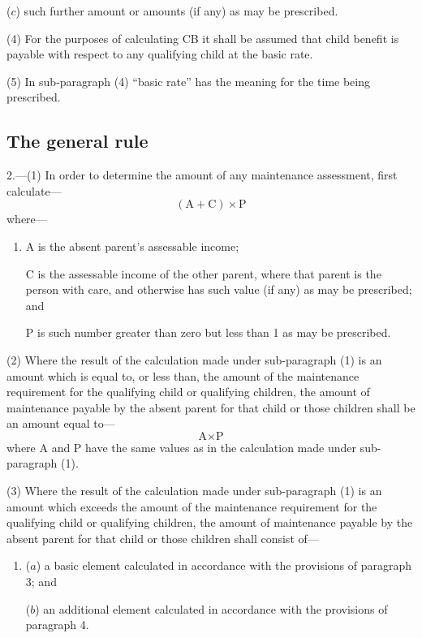 \documentclass[a4paper]{article}
\begin{document}
{\begin{enumerate}
($c$) such further amount or amounts (if any) as may be prescribed.
\end{enumerate}

(4)
For the purposes of calculating CB it shall be assumed that child benefit is payable with respect to any qualifying child at the basic rate.

(5)
In sub-paragraph (4) “basic rate” has the meaning for the time being prescribed.

\subsection*{The general rule}

2.---(1) In order to determine the amount of any maintenance assessment, first calculate---
\[ (\textrm{A} + \textrm{C}) \times \textrm{P}\]
where---
\begin{enumerate}\item[]
A is the absent parent’s assessable income;

C is the assessable income of the other parent, where that parent is the person with care, and otherwise has such value (if any) as may be prescribed; and

P is such number greater than zero but less than 1 as may be prescribed.
\end{enumerate}

(2) Where the result of the calculation made under sub-paragraph (1) is an amount which is equal to, or less than, the amount of the maintenance requirement for the qualifying child or qualifying children, the amount of maintenance payable by the absent parent for that child or those children shall be an amount equal to—
\[\textrm{A} \times \textrm{P}\]
where A and P have the same values as in the calculation made under sub-paragraph (1).

(3) Where the result of the calculation made under sub-paragraph (1) is an amount which exceeds the amount of the maintenance requirement for the qualifying child or qualifying children, the amount of maintenance payable by the absent parent for that child or those children shall consist of---
\begin{enumerate}\item[]
($a$) a basic element calculated in accordance with the provisions of paragraph 3; and

($b$) an additional element calculated in accordance with the provisions of paragraph 4.
\end{enumerate}

}
\end{document}
